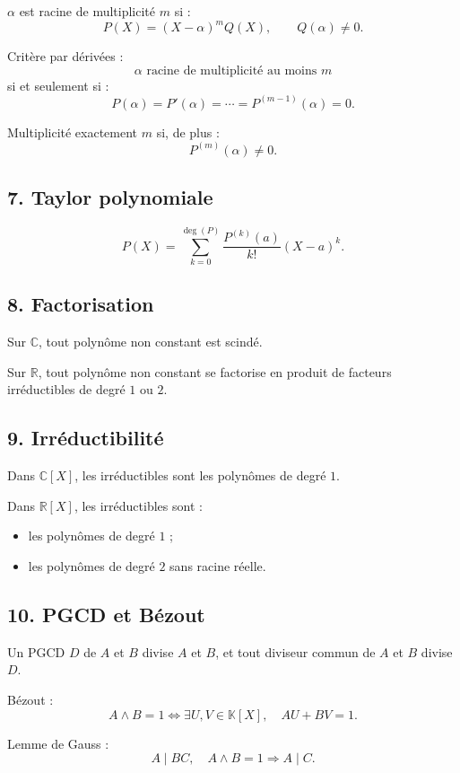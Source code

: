 \documentclass[11pt,a4paper]{article}
\newcommand{\K}{\mathbb K}
\newcommand{\R}{\mathbb R}
\newcommand{\C}{\mathbb C}
\begin{document}
\(\alpha\) est racine de multiplicité \(m\) si :
\[
P(X)=(X-\alpha)^mQ(X),
\qquad
Q(\alpha)\neq0.
\]

Critère par dérivées :
\[
\alpha\text{ racine de multiplicité au moins }m
\]
si et seulement si :
\[
P(\alpha)=P'(\alpha)=\cdots=P^{(m-1)}(\alpha)=0.
\]

Multiplicité exactement \(m\) si, de plus :
\[
P^{(m)}(\alpha)\neq0.
\]

\subsection*{7. Taylor polynomiale}

\[
P(X)=\sum_{k=0}^{\deg(P)}
\frac{P^{(k)}(a)}{k!}(X-a)^k.
\]

\subsection*{8. Factorisation}

Sur \(\C\), tout polynôme non constant est scindé.

Sur \(\R\), tout polynôme non constant se factorise en produit de facteurs irréductibles de degré \(1\) ou \(2\).

\subsection*{9. Irréductibilité}

Dans \(\C[X]\), les irréductibles sont les polynômes de degré \(1\).

Dans \(\R[X]\), les irréductibles sont :
\begin{itemize}
    \item les polynômes de degré \(1\) ;
    \item les polynômes de degré \(2\) sans racine réelle.
\end{itemize}

\subsection*{10. PGCD et Bézout}

Un PGCD \(D\) de \(A\) et \(B\) divise \(A\) et \(B\), et tout diviseur commun de \(A\) et \(B\) divise \(D\).

Bézout :
\[
A\wedge B=1
\Longleftrightarrow
\exists U,V\in\K[X],
\quad
AU+BV=1.
\]

Lemme de Gauss :
\[
A\mid BC,\quad A\wedge B=1
\Longrightarrow
A\mid C.
\]
\end{document}
